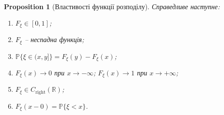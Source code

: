 \documentclass[a4paper, 10pt]{article}
\theoremstyle{theoremdd}
\newtheorem{proposition}[theorem]{Proposition}
\begin{document}
\begin{proposition}[Властивості функції розподілу]
Справедливе наступне:
\begin{enumerate}[nosep,wide=0pt,label={\arabic*)}]
\item $F_\xi \in [0,1]$;
\item $F_\xi$ -- неспадна функція;
\item $\mathbb{P}\{\xi \in (x,y]\} = F_\xi(y) - F_\xi(x)$;
\item $F_\xi(x) \to 0$ при $x \to -\infty$; \qquad $F_\xi(x) \to 1$ при $x \to +\infty$;
\item $F_\xi \in C_{\text{right}}(\mathbb{R})$; 
\item $F_\xi(x-0) = \mathbb{P}\{\xi < x\}$.
\end{enumerate}
\end{proposition}
\end{document}
